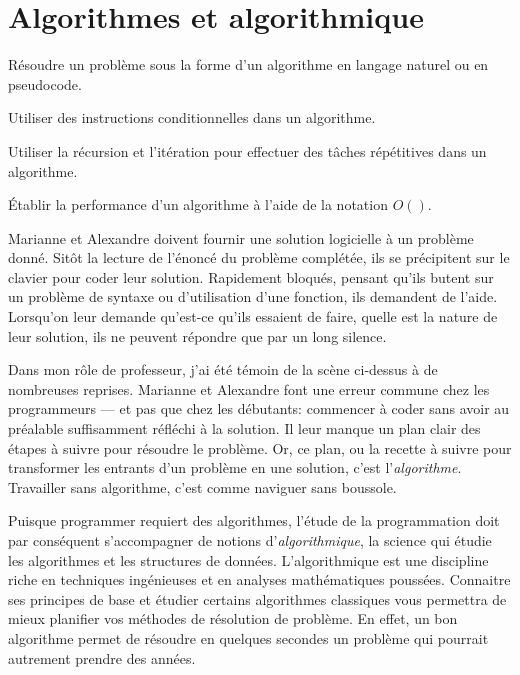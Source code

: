 
\chapter{Algorithmes et algorithmique}
\label{chap:algorithmes}

\def\scriptfilename{\currfilebase.R}

\begin{objectifs}
\item Résoudre un problème sous la forme d'un algorithme en langage
  naturel ou en pseudocode.
\item Utiliser des instructions conditionnelles dans un algorithme.
\item Utiliser la récursion et l'itération pour effectuer des tâches
  répétitives dans un algorithme.
\item Établir la performance d'un algorithme à l'aide de la notation
  $O()$.
\end{objectifs}

Marianne et Alexandre doivent fournir une solution logicielle à un
problème donné. Sitôt la lecture de l'énoncé du problème complétée,
ils se précipitent sur le clavier pour coder leur solution. Rapidement
bloqués, pensant qu'ils butent sur un problème de syntaxe ou
d'utilisation d'une fonction, ils demandent de l'aide. Lorsqu'on leur
demande qu'est-ce qu'ils essaient de faire, quelle est la nature de leur
solution, ils ne peuvent répondre que par un long silence.

Dans mon rôle de professeur, j'ai été témoin de la scène ci-dessus à
de nombreuses reprises. Marianne et Alexandre font une erreur commune
chez les programmeurs --- et pas que chez les débutants: commencer à
coder sans avoir au préalable suffisamment réfléchi à la solution. Il
leur manque un plan clair des étapes à suivre pour résoudre le
problème. Or, ce plan, ou la recette à suivre pour transformer les
entrants d'un problème en une solution, c'est
l'\emph{algorithme}. Travailler sans algorithme,
c'est comme naviguer sans boussole.

Puisque programmer requiert des algorithmes, l'étude de la
programmation doit par conséquent s'accompagner de notions
d'\emph{algorithmique}, la science qui étudie les
algorithmes et les structures de données. L'algorithmique est une
discipline riche en techniques ingénieuses et en analyses
mathématiques poussées. Connaitre ses principes de base et étudier
certains algorithmes classiques vous permettra de mieux planifier vos
méthodes de résolution de problème. En effet, un bon algorithme permet
de résoudre en quelques secondes un problème qui pourrait autrement
prendre des années.


